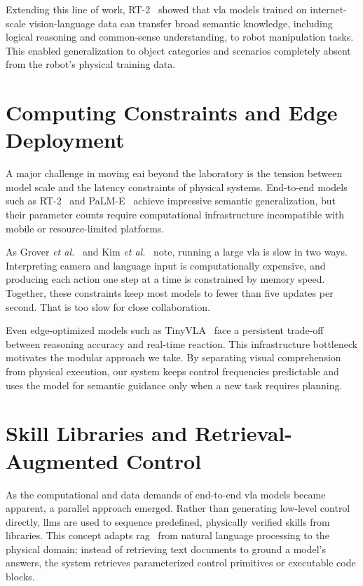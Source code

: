 Extending this line of work, RT-2~\cite{brohan2023rt2visionlanguageactionmodelstransfer} showed that \gls{vla} models trained on internet-scale vision-language data can transfer broad semantic knowledge, including logical reasoning and common-sense understanding, to robot manipulation tasks. This enabled generalization to object categories and scenarios completely absent from the robot’s physical training data.

\section{Computing Constraints and Edge Deployment}
A major challenge in moving \gls{eai} beyond the laboratory is the tension between model scale and the latency constraints of physical systems. End-to-end models such as RT-2~\cite{brohan2023rt2visionlanguageactionmodelstransfer} and PaLM-E~\cite{driess2023palmeembodiedmultimodallanguage} achieve impressive semantic generalization, but their parameter counts require computational infrastructure incompatible with mobile or resource-limited platforms.

As Grover \emph{et al.}~\cite{grover2026embodiedfoundationmodelsedge} and Kim \emph{et al.}~\cite{kim2024openvlaopensourcevisionlanguageactionmodel} note, running a large \gls{vla} is slow in two ways. Interpreting camera and language input is computationally expensive, and producing each action one step at a time is constrained by memory speed. Together, these constraints keep most models to fewer than five updates per second. That is too slow for close collaboration.

Even edge-optimized models such as TinyVLA~\cite{wen2025tinyvlafastdataefficientvisionlanguageaction} face a persistent trade-off between reasoning accuracy and real-time reaction. This infrastructure bottleneck motivates the modular approach we take. By separating visual comprehension from physical execution, our system keeps control frequencies predictable and uses the model for semantic guidance only when a new task requires planning.

\section{Skill Libraries and Retrieval-Augmented Control}
As the computational and data demands of end-to-end \gls{vla} models became apparent, a parallel approach emerged. Rather than generating low-level control directly, \glspl{llm} are used to sequence predefined, physically verified skills from libraries. This concept adapts \gls{rag}~\cite{lewis2021retrievalaugmentedgenerationknowledgeintensivenlp} from natural language processing to the physical domain; instead of retrieving text documents to ground a model’s answers, the system retrieves parameterized control primitives or executable code blocks.

